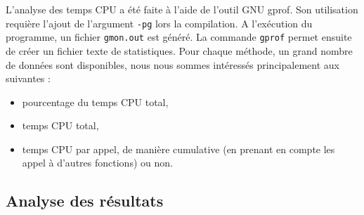 L'analyse des temps CPU a été faite à l'aide de l'outil GNU gprof. Son utilisation requière l'ajout de l'argument \texttt{-pg} lors la compilation. A l'exécution du programme, un fichier \texttt{gmon.out} est généré. La commande \texttt{gprof} permet ensuite de créer un fichier texte de statistiques. Pour chaque méthode, un grand nombre de données sont disponibles, nous nous sommes intéressés principalement aux suivantes :
\begin{itemize}
\item pourcentage du temps CPU total,
\item temps CPU total,
\item temps CPU par appel, de manière cumulative (en prenant en compte les appel à d'autres fonctions) ou non.
\end{itemize}

\subsection{Analyse des résultats}